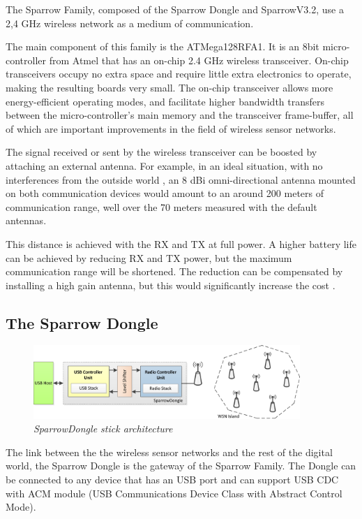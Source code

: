 The Sparrow Family, composed of the Sparrow Dongle and SparrowV3.2, use a 2,4 GHz wireless network as a medium of communication. 

The main component of this family is the ATMega128RFA1. It is an 8bit micro-controller from Atmel that has an on-chip 2.4 GHz wireless transceiver. On-chip transceivers occupy no extra space and require little extra electronics to operate, making the resulting boards very small. The on-chip transceiver allows more energy-efficient operating modes, and facilitate higher bandwidth transfers between the micro-controller's main memory and the transceiver frame-buffer, all
of which are important improvements in the field of wireless sensor networks. 

The signal received or sent by the wireless transceiver can be boosted by attaching an external antenna. For example, in an ideal situation, with no interferences from the outside world , an 8 dBi omni-directional antenna mounted on both communication devices would amount to an around 200 meters of communication range, well over the 70 meters measured with the default antennas.

This distance is achieved with the RX and TX at full power. A higher battery life can be achieved by reducing RX and TX power, but the maximum communication range will be shortened. The reduction can be compensated by installing a high gain antenna, but this would significantly increase the cost .

\subsection{The Sparrow Dongle}

\begin{figure}[ht]
\begin{center}
\includegraphics[width=0.9\textwidth]{img/donge_architecture.png}
\end{center}
\caption{\small \itshape{SparrowDongle stick architecture}\cite{voinescu2013lightweight}}
\end{figure}
 
The link between the the wireless sensor networks and the rest of the digital world, the Sparrow Dongle is the gateway of the Sparrow Family. The Dongle can be connected to any device that has an USB port and can support USB CDC with ACM module (USB Communications Device Class with Abstract Control Mode). 

